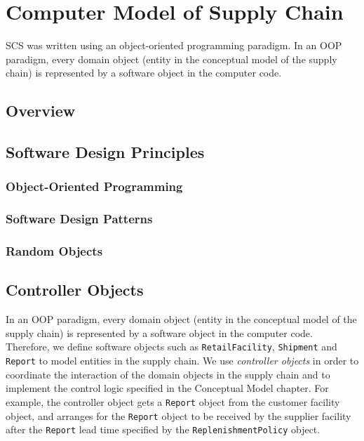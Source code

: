 \documentclass[12pt,twocolumn]{article}
\newcommand{\code}[1]{{\scriptsize \texttt{#1}}}
\begin{document}
\tableofcontents

\clearpage

\section{Computer Model of Supply Chain}

SCS was written using an object-oriented programming paradigm.
In an OOP paradigm,
every domain object (entity in the conceptual model of the supply chain)
is represented by a software object in the computer code.

\subsection{Overview}

\subsection{Software Design Principles}

\subsubsection{Object-Oriented Programming}

\subsubsection{Software Design Patterns}

\subsubsection{Random Objects}

\subsection{Controller Objects}

In an OOP paradigm,
every domain object (entity in the conceptual model of the supply chain)
is represented by a software object in the computer code.
Therefore, we define software objects such as
\code{RetailFacility}, \code{Shipment} and \code{Report}
to model entities in the supply chain.
We use \emph{controller objects}
in order to coordinate the interaction
of the domain objects in the supply chain
and to implement the control logic specified in the Conceptual Model chapter.
For example, the controller object
gets a \code{Report} object from the customer facility object,
and arranges for the \code{Report} object
to be received by the supplier facility
after the \code{Report} lead time specified by the
\code{ReplenishmentPolicy} object.
\end{document}
